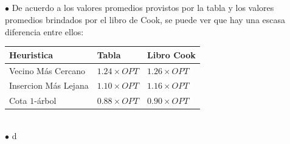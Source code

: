 \documentclass[10pt,a4paper]{report}
\begin{document}
\ \\\\\\\\
$\bullet$ De acuerdo a los valores promedios provistos por la tabla y los valores promedios brindados por el libro de Cook, se puede ver que hay una escasa diferencia entre ellos:
\begin{table}[htbp]
\begin{center}
\begin{tabular}{|l|l|l|}
\hline
Heuristica & Tabla & Libro Cook\\
\hline
Vecino M\'as Cercano & $1.24\times OPT$ & $1.26\times OPT$\\
Insercion M\'as Lejana & $1.10\times OPT$ & $1.16\times OPT$\\
Cota $1$-\'arbol & $0.88\times OPT$ & $0.90 \times OPT$\\ 
\hline
\end{tabular}
\end{center}
\end{table}
\\
$\bullet$ d
\end{document}
